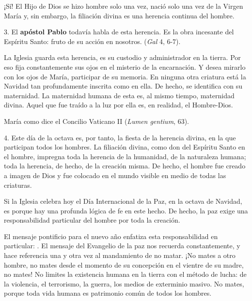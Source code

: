 \begin{body}
	¡Sí! El Hijo de Dios se hizo hombre solo una vez, nació solo una vez de la Virgen María y, sin embargo, la filiación divina es una herencia continua del hombre.

	3. El \textbf{apóstol Pablo} todavía habla de esta herencia. Es la obra incesante del Espíritu Santo: fruto de su acción en nosotros.  (\emph{Gal} 4, 6-7).

	La Iglesia guarda esta herencia, es su custodio y administrador en la tierra. Por eso fija constantemente sus ojos en el misterio de la encarnación. Y desea mirarlo con los ojos de María, participar de su memoria. En ninguna otra criatura está la Navidad tan profundamente inscrita como en ella. De hecho, se identifica con su maternidad. La maternidad humana de esta  es, al mismo tiempo, maternidad divina. Aquel que fue traído a la luz por ella es, en realidad, el Hombre-Dios.

	María como dice el Concilio Vaticano II  (\emph{Lumen gentium}, 63).

	4. Este día de la octava es, por tanto, la fiesta de la herencia divina, en la que participan todos los hombres. La filiación divina, como don del Espíritu Santo en el hombre, impregna toda la herencia de la humanidad, de la naturaleza humana; toda la herencia, de hecho, de la creación misma. De hecho, el hombre fue creado a imagen de Dios y fue colocado en el mundo visible en medio de todas las criaturas.

	Si la Iglesia celebra hoy el Día Internacional de la Paz, en la octava de Navidad, es porque hay una profunda lógica de fe en este hecho. De hecho, la paz exige una responsabilidad particular del hombre por toda la creación.

	El mensaje pontificio para el nuevo año enfatiza esta responsabilidad en particular: . El mensaje del Evangelio de la paz nos recuerda constantemente, y hace referencia una y otra vez al mandamiento de no matar. ¡No mates a otro hombre, no mates desde el momento de su concepción en el vientre de su madre, no mates! No limites la existencia humana en la tierra con el método de lucha: de la violencia, el terrorismo, la guerra, los medios de exterminio masivo. No mates, porque toda vida humana es patrimonio común de todos los hombres.


\end{body}
